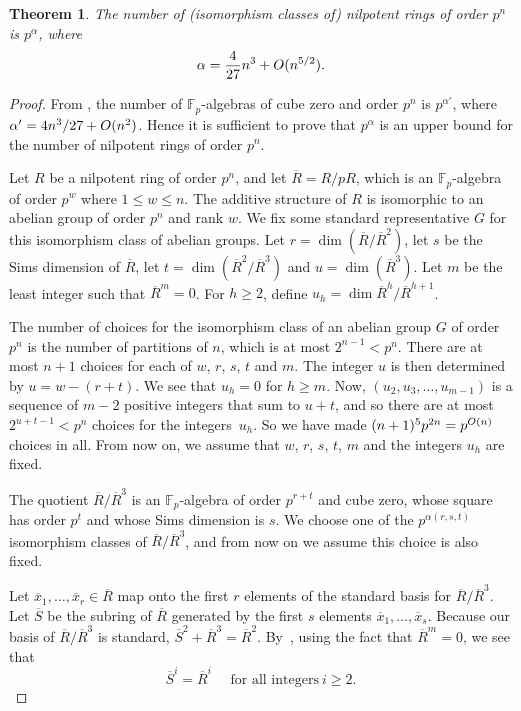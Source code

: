 \documentclass[12pt]{article}
\newtheorem{Thm}{Theorem}[section]
\begin{document}
\begin{Thm} \label{main nilpotent}
The number of (isomorphism classes of) nilpotent rings of order $p^{n}$ is $p^{\alpha}$, where
\begin{displaymath}
\alpha = \frac{4}{27}n^{3} + \mathnormal{O}(n^{5/2}).
\end{displaymath}
\end{Thm}
\begin{proof} From \cite[Theorem 2.2]{K & P}, the number of $\mathbb{F}_{p}$-algebras of cube zero and order $p^{n}$ is $p^{\alpha'}$, where $\alpha' = 4n^{3}/27 + \mathnormal{O}(n^{2})$. Hence it is sufficient to prove that $p^{\alpha}$ is an upper bound for the number of nilpotent rings of order $p^{n}$.

Let $R$ be a nilpotent ring of order $p^n$, and let $\overline{R} = R/pR$, which is an $\mathbb{F}_{p}$-algebra of order $p^w$ where $1\leq w\leq n$. The additive structure of $R$ is isomorphic to an abelian group of order $p^{n}$ and rank $w$. We fix some standard representative $G$ for this isomorphism class of abelian groups. Let $r = \dim(\overline{R}/\overline{R}^{2})$, let $s$ be the Sims dimension of $\overline{R}$, let $t = \dim(\overline{R}^{2}/\overline{R}^{3})$ and $u = \dim(\overline{R}^{3})$. Let $m$ be the least integer such that $\overline{R}^{m} = 0$. For $h\geq 2$, define $u_h=\dim \overline{R}^h/\overline{R}^{h+1}$.

The number of choices for the isomorphism class of an abelian group $G$ of order $p^n$ is the number of partitions of $n$, which is at most $2^{n-1}<p^n$. There are at most $n+1$ choices for each of $w$, $r$, $s$, $t$ and $m$. The integer $u$ is then determined by $u=w-(r+t)$. We see that $u_h=0$ for $h\geq m$. Now, $(u_2,u_3,\ldots,u_{m-1})$ is a sequence of $m-2$ positive integers that sum to $u+t$, and so there are at most $2^{u+t-1}<p^{n}$ choices for the integers~$u_h$.
  So we have made $(n+1)^5 p^{2n}=p^{\mathnormal{O}(n)}$ choices in all. From now on, we assume that $w$, $r$, $s$, $t$, $m$ and the integers $u_h$ are fixed.

The quotient $\overline{R}/\overline{R}^3$ is an $\mathbb{F}_p$-algebra of order $p^{r+t}$ and cube zero, whose square has order $p^t$ and whose Sims dimension is $s$. We choose one of the $p^{\alpha(r,s,t)}$ isomorphism classes of $\overline{R}/\overline{R}^3$, and from now on we assume this choice is also fixed.

Let $\overline{x}_{1}, \ldots, \overline{x}_{r}\in \overline{R}$ map onto the first $r$ elements of the standard basis for $\overline{R}/\overline{R}^3$. Let $\overline{S}$ be the subring of $\overline{R}$ generated by the first $s$ elements $\overline{x}_{1}, \ldots, \overline{x}_{s}$. Because our basis of $\overline{R}/\overline{R}^3$ is standard, $\overline{S}^{2}+\overline{R}^3 = \overline{R}^{2}$. By~\cite[Theorem~5.2]{K & P}, using the fact that $\overline{R}^m=0$, we see that  
\begin{equation} \label{powers of S}
\overline{S}^{i} = \overline{R}^{i} \quad \textrm{ for all integers} \ i \geq 2.
\end{equation}


\end{proof}
\end{document}
